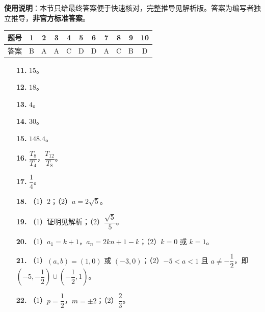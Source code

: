 
\begin{gknotice}
\textbf{使用说明}：本节只给最终答案便于快速核对，完整推导见解析版。答案为编写者独立推导，\textbf{非官方标准答案}。
\end{gknotice}

\begin{center}\begin{tabular}{ccccccccccc}
\toprule
题号 & 1 & 2 & 3 & 4 & 5 & 6 & 7 & 8 & 9 & 10 \\
\midrule
答案 & B & A & A & C & D & D & A & C & B & D \\
\bottomrule
\end{tabular}\end{center}

\begin{itemize}[leftmargin=2.6em]
  \item[\textbf{11.}] $15$。
  \item[\textbf{12.}] $18$。
  \item[\textbf{13.}] $4$。
  \item[\textbf{14.}] $30$。
  \item[\textbf{15.}] $148.4$。
  \item[\textbf{16.}] $\dfrac{T_8}{T_4}$，$\dfrac{T_{12}}{T_8}$。
  \item[\textbf{17.}] $\dfrac14$。
\end{itemize}

\begin{itemize}[leftmargin=2.6em]
  \item[\textbf{18.}] （1）$2$；（2）$a=2\sqrt5$。
  \item[\textbf{19.}] （1）证明见解析；（2）$\dfrac{\sqrt5}{5}$。
  \item[\textbf{20.}] （1）$a_1=k+1$，$a_n=2kn+1-k$；（2）$k=0$ 或 $k=1$。
  \item[\textbf{21.}] （1）$(a,b)=(1,0)$ 或 $(-3,0)$；（2）$-5<a<1$ 且 $a\neq-\dfrac12$，即 $(-5,-\dfrac12)\cup(-\dfrac12,1)$。
  \item[\textbf{22.}] （1）$p=\dfrac12$，$m=\pm2$；（2）$\dfrac23$。
\end{itemize}
